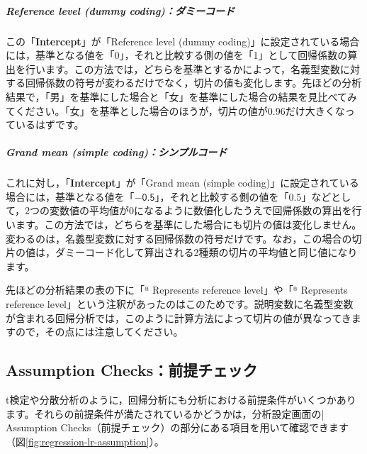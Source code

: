 \documentclass[
  12pt,
  a5jpaper,
  lualatex, ja=standard]{bxjsbook}
\begin{document}
\hypertarget{reference-level-dummy-codingux30c0ux30dfux30fcux30b3ux30fcux30c9}{%
\subparagraph*{Reference level (dummy coding)：ダミーコード}\label{reference-level-dummy-codingux30c0ux30dfux30fcux30b3ux30fcux30c9}}

この「\textbf{Intercept}」が「Reference level (dummy coding)」に設定されている場合には，基準となる値を「0」，それと比較する側の値を「1」として回帰係数の算出を行います。この方法では，どちらを基準とするかによって，名義型変数に対する回帰係数の符号が変わるだけでなく，切片の値も変化します。先ほどの分析結果で，「男」を基準にした場合と「女」を基準にした場合の結果を見比べてみてください。「女」を基準とした場合のほうが，切片の値が0.96だけ大きくなっているはずです。

\hypertarget{grand-mean-simple-codingux30b7ux30f3ux30d7ux30ebux30b3ux30fcux30c9}{%
\subparagraph*{Grand mean (simple coding)：シンプルコード}\label{grand-mean-simple-codingux30b7ux30f3ux30d7ux30ebux30b3ux30fcux30c9}}

これに対し，「\textbf{Intercept}」が「Grand mean (simple coding)」に設定されている場合には，基準となる値を「\(-\textsf{0.5}\)」，それと比較する側の値を「0.5」などとして，2つの変数値の平均値が0になるように数値化したうえで回帰係数の算出を行います。この方法では，どちらを基準にした場合にも切片の値は変化しません。変わるのは，名義型変数に対する回帰係数の符号だけです。なお，この場合の切片の値は，ダミーコード化して算出される2種類の切片の平均値と同じ値になります。

先ほどの分析結果の表の下に「ª Represents reference level」や「ª Represents reference level」という注釈があったのはこのためです。説明変数に名義型変数が含まれる回帰分析では，このように計算方法によって切片の値が異なってきますので，その点には注意してください。

\hypertarget{sub:regression-LR-assumption}{%
\subsection{Assumption Checks：前提チェック}\label{sub:regression-LR-assumption}}

t検定や分散分析のように，回帰分析にも分析における前提条件がいくつかあります。それらの前提条件が満たされているかどうかは，分析設定画面の\colorbox{bar}{\textcolor{gmoji2}{| Assumption Checks}}（前提チェック）の部分にある項目を用いて確認できます（図\ref{fig:regression-lr-assumption}）。
\end{document}
